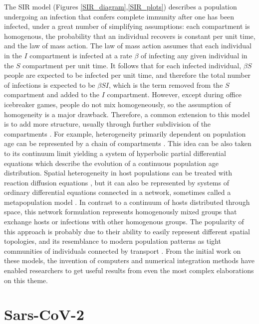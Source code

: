 The SIR model (Figures \ref{SIR_diagram},\ref{SIR_plots}) describes a population undergoing an infection that confers complete immunity after one has been infected, under a great number of simplifying assumptions: each compartment is homogenous, the probability that an individual recovers is constant per unit time, and the law of mass action. The law of mass action assumes that each individual in the $I$ compartment is infected at a rate $\beta$ of infecting any given individual in the $S$ compartment per unit time. It follows that for each infected individual, $\beta S$ people are expected to be infected per unit time, and therefore the total number of infections is expected to be $\beta S I$, which is the term removed from the $S$ compartment and added to the $I$ compartment. However, except during office icebreaker games, people do not mix homogeneously, so the assumption of homogeneity is a major drawback. Therefore, a common extension to this model is to add more structure, usually through further subdivision of the compartments \cite{hethcote2000mathematics}. For example, heterogeneity primarily dependent on population age can be represented by a chain of compartments \cite{hethcote1997age}. This idea can be also taken to its continuum limit yielding a system of hyperbolic partial differential equations \cite{anderson1985vaccination} which describe the evolution of a continuous population age distribution. Spatial heterogeneity in host populations can be treated with reaction diffusion equations \cite{rass2003spatial}, but it can also be represented by systems of ordinary differential equations connected in a network, sometimes called a metapopulation model \cite{house2008deterministic,levins1969some,colizza2007invasion, nowzari2016analysis}. In contrast to a continuum of hosts distributed through space, this network formulation represents homogenously mixed groups that exchange hosts or infections with other homogenous groups. The popularity of this approach is probably due to their ability to easily represent different spatial topologies, and its resemblance to modern population patterns as tight communities of individuals connected by transport \cite{ball2015seven}. From the initial work on these models, the invention of computers and numerical integration methods have enabled researchers to get useful results from even the most complex elaborations on this theme. 

\section{Sars-CoV-2}


